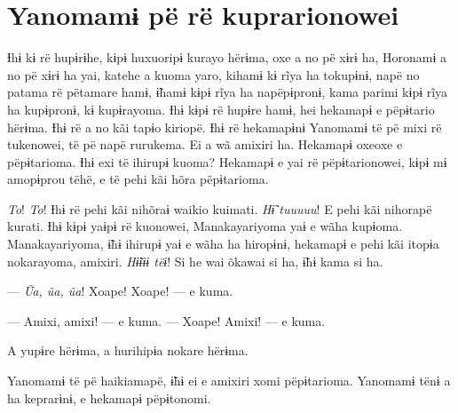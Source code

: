 \chapter*{Yanomamɨ pë rë kuprarionowei\smallskip{}}

  

Ɨhɨ kɨ rë hupɨrɨhe, kɨpɨ huxuoripɨ kurayo hërɨma, oxe a no pë xɨrɨ ha,
Horonamɨ a no pë xɨrɨ ha yai, katehe a kuoma yaro, kihamɨ kɨ rĩya ha
tokupɨnɨ, napë no patama rë pëtamare hamɨ, ɨ̃hamɨ kɨpɨ rĩya ha
napëpɨpronɨ, kama parimi kɨpɨ rĩya ha kupɨpronɨ, kɨ kupɨrayoma. Ɨhɨ kɨpɨ
rë hupɨre hamɨ, hei hekamapɨ e pëpɨtario hërɨma. Ɨhɨ rë a no kãi tapɨo
kiriopë. Ɨhɨ rë hekamapɨnɨ Yanomamɨ të pë mixi rë tukenowei, të pë napë
rurukema. Ei a wã amixiri ha. Hekamapɨ oxeoxe e pëpɨtarioma. Ɨhɨ exi të
ihirupɨ kuoma? Hekamapɨ e yai rë pëpɨtarionowei, kɨpɨ mɨ amopɨprou tëhë,
e të pehi kãi hõra pëpɨtarioma. 

\textit{To}! \textit{To}! Ɨhɨ rë pehi kãi nihõraɨ waikio kuimati. \textit{Hɨ̃ tuuuuu}! E pehi kãi
nihorapë kurati. Ɨhɨ kɨpɨ yaɨpɨ rë kuonowei, Manakayariyoma yaɨ e wãha
kupɨoma. Manakayariyoma, ɨ̃hɨ ihirupɨ yaɨ e wãha ha hiropɨnɨ, hekamapɨ e
pehi kãi itopɨa nokarayoma, amixiri. \textit{Hɨ̃ɨɨɨ tëɨ}! Si he wai õkawai si ha,
ɨ̃hɨ kama si ha. 

--- \textit{Ũa, ũa, ũa}! Xoape! Xoape! --- e kuma. 


--- Amixi, amixi! --- e kuma. --- Xoape! Amixi! --- e kuma. 

A yupɨre hërɨma, a hurihipɨa nokare hërɨma. 

Yanomamɨ të pë haikiamapë, ɨ̃hɨ ei e amixiri xomi pëpɨtarioma. Yanomamɨ
tënɨ a ha keprarɨnɨ, e hekamapɨ pëpɨtonomi. 


